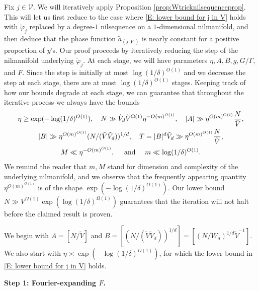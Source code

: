 \documentclass[11pt]{amsart}
\theoremstyle{definition}
\begin{document}
Fix $j\in\mathcal{V}$. We will iteratively apply Proposition  \ref{prop:Wtricknilsequenceprop}.  This will let us first reduce to the case where \eqref{E: lower bound for j in V} holds with $\tilde{\varphi}_{j}$ replaced by a degree-$1$ nilsequence on a $1$-dimensional nilmanifold, and then deduce that the phase function $\tilde{a}_{(j, V')}$ is nearly constant for a positive proportion of $y$'s. Our proof proceeds by iteratively reducing the step of the nilmanifold underlying $\tilde{\varphi}_{j}$. At each stage, we will have parameters $\eta, A, B, g, G/\Gamma$, and $F$. Since the step is initially at most $\log (1/\delta)^{O(1)}$ and we decrease the step at each stage, there are at most $\log (1/\delta)^{O(1)}$ stages.  Keeping track of how our bounds degrade at each stage, we can guarantee that throughout the iterative process we always have the bounds
\begin{gather*}
    \eta \geq \exp(-\log(1/\delta)^{O(1)}),\quad N \gg \Tilde{V}_d \tilde{V}^{\Omega(1)}\eta^{-O(m)^{O(1)}}, \quad |A| \gg \eta^{O(m)^{O(1)}}\frac{N}{\tilde{V}},\\ |B| \gg \eta^{O(m)^{O(1)}}(N/(\tilde{V}\tilde{V}_d))^{1/d},\quad T =|B|^d \Tilde{V}_d\gg \eta^{O(m)^{O(1)}} \frac{N}{\tilde{V}}, \\ M\ll \eta^{-O(m)^{O(1)}},\quad \text{ and }\quad
    m \ll \log(1/\delta)^{O(1)}.
\end{gather*}
We remind the reader that $m,M$ stand for dimension and complexity of the underlying nilmanifold, and we observe that the frequently appearing quantity $\eta^{O(m)^{O(1)}}$ is of the shape $\exp(-\log(1/\delta)^{O(1)})$.
Our lower bound $N\gg V^{\Omega(1)}\exp(\log(1/\delta)^{\Omega(1)})$ guarantees that the iteration will not halt before the claimed result is proven.

We begin with $A = [N/\tilde{V}]$ and $B = [(N/(\tilde{V}\tilde{V}_d))^{1/d}]=[(N/W_d)^{1/d}\tilde{V}^{-1}]$. We also start with $\eta \asymp \exp(-\log(1/\delta)^{O(1)})$, for which the lower bound in \eqref{E: lower bound for j in V} holds. 

\textbf{Step 1: Fourier-expanding $F$.}
\smallskip
\end{document}
